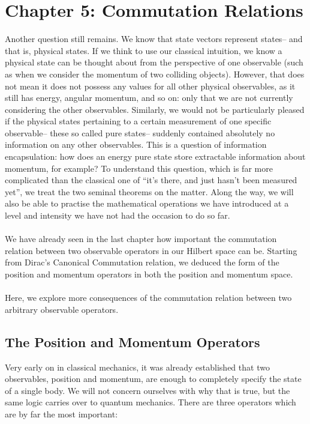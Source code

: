 \chapter{Chapter 5: Commutation Relations}
Another question still remains. We know that state vectors represent states-- and that is, physical states. If we think to use our classical intuition, we know a physical state can be thought about from the perspective of one observable (such as when we consider the momentum of two colliding objects). However, that does not mean it does not possess any values for all other physical observables, as it still has energy, angular momentum, and so on: only that we are not currently considering the other observables. Similarly, we would not be particularly pleased if the physical states pertaining to a certain measurement of one specific observable-- these so called pure states-- suddenly contained absolutely no information on any other observables. This is a question of information encapsulation: how does an energy pure state store extractable information about momentum, for example? To understand this question, which is far more complicated than the classical one of ``it's there, and just hasn't been measured yet'', we treat the two seminal theorems on the matter. Along the way, we will also be able to practise the mathematical operations we have introduced at a level and intensity we have not had the occasion to do so far.
\\\\
We have already seen in the last chapter how important the commutation relation between two observable operators in our Hilbert space can be. Starting from Dirac's Canonical Commutation relation, we deduced the form of the position and momentum operators in both the position and momentum space.
\\\\
Here, we explore more consequences of the commutation relation between two arbitrary observable operators.
\section{The Position and Momentum Operators}
Very early on in classical mechanics, it was already established that two observables, position and momentum, are enough to completely specify the state of a single body. We will not concern ourselves with why that is true, but the same logic carries over to quantum mechanics. There are three operators which are by far the most important:
